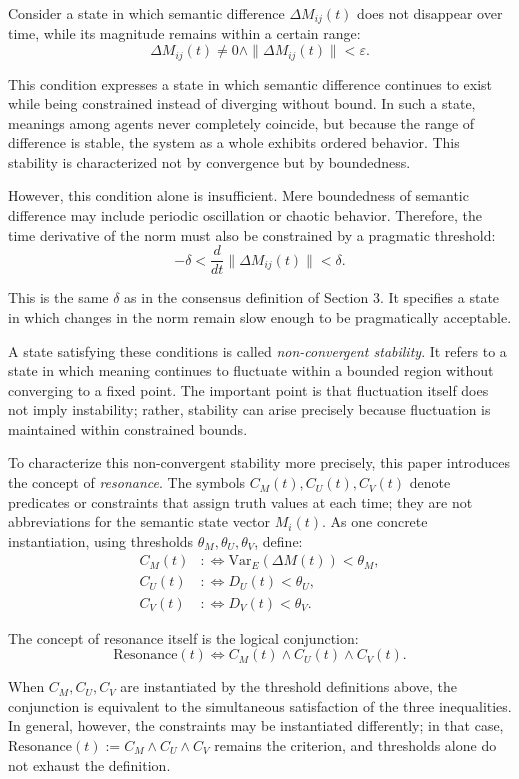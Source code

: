 \documentclass[11pt,a4paper]{article}
\theoremstyle{definition}
\begin{document}
Consider a state in which semantic difference $\Delta M_{ij}(t)$ does not disappear over time, while its magnitude remains within a certain range:
\[
\Delta M_{ij}(t) \neq 0 \land \|\Delta M_{ij}(t)\| < \varepsilon.
\]

This condition expresses a state in which semantic difference continues to exist while being constrained instead of diverging without bound. In such a state, meanings among agents never completely coincide, but because the range of difference is stable, the system as a whole exhibits ordered behavior. This stability is characterized not by convergence but by boundedness.

However, this condition alone is insufficient. Mere boundedness of semantic difference may include periodic oscillation or chaotic behavior. Therefore, the time derivative of the norm must also be constrained by a pragmatic threshold:
\[
-\delta < \frac{d}{dt}\|\Delta M_{ij}(t)\| < \delta.
\]

This is the same $\delta$ as in the consensus definition of Section 3. It specifies a state in which changes in the norm remain slow enough to be pragmatically acceptable.

A state satisfying these conditions is called \textit{non-convergent stability}. It refers to a state in which meaning continues to fluctuate within a bounded region without converging to a fixed point. The important point is that fluctuation itself does not imply instability; rather, stability can arise precisely because fluctuation is maintained within constrained bounds.

To characterize this non-convergent stability more precisely, this paper introduces the concept of \textit{resonance}. The symbols $C_M(t), C_U(t), C_V(t)$ denote predicates or constraints that assign truth values at each time; they are not abbreviations for the semantic state vector $M_i(t)$. As one concrete instantiation, using thresholds $\theta_M, \theta_U, \theta_V$, define:
\begin{align}
C_M(t) &: \Leftrightarrow \text{Var}_E(\Delta M(t)) < \theta_M, \\
C_U(t) &: \Leftrightarrow D_U(t) < \theta_U, \\
C_V(t) &: \Leftrightarrow D_V(t) < \theta_V.
\end{align}

The concept of resonance itself is the logical conjunction:
\[
\text{Resonance}(t) \Leftrightarrow C_M(t) \land C_U(t) \land C_V(t).
\]

When $C_M, C_U, C_V$ are instantiated by the threshold definitions above, the conjunction is equivalent to the simultaneous satisfaction of the three inequalities. In general, however, the constraints may be instantiated differently; in that case, $\text{Resonance}(t) := C_M \land C_U \land C_V$ remains the criterion, and thresholds alone do not exhaust the definition.
\end{document}
